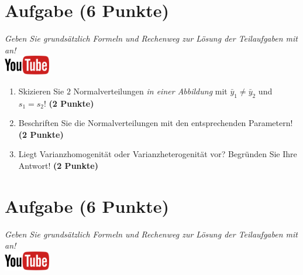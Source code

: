 \documentclass[a4paper, 10pt]{scrartcl}\usepackage[]{graphicx}\usepackage[]{xcolor}
\begin{document}
 
\clearpage

\section{Aufgabe \hfill (6 Punkte)}

\textit{Geben Sie grunds{\"a}tzlich Formeln und Rechenweg zur L{\"o}sung der
  Teilaufgaben mit an!} \\[1Ex]

\hfill\href{https://youtu.be/ZrJhn2wPbq4}{\includegraphics[width =
  2cm]{img/youtube}}\\[1Ex]



\begin{enumerate}
\item Skizieren Sie $2$ Normalverteilungen \textit{in einer
    Abbildung} mit $\bar{y}_1 \neq \bar{y}_2$ und $s_1 = s_2$! \textbf{(2 Punkte)}
\item Beschriften Sie die Normalverteilungen mit den entsprechenden
  Parametern! \textbf{(2 Punkte)}
\item Liegt Varianzhomogenit{\"a}t oder Varianzheterogenit{\"a}t vor? Begr{\"u}nden Sie
  Ihre Antwort! \textbf{(2 Punkte)}
\end{enumerate}

 
\clearpage

\section{Aufgabe \hfill (6 Punkte)}

\textit{Geben Sie grunds{\"a}tzlich Formeln und Rechenweg zur L{\"o}sung der
  Teilaufgaben mit an!} \\[1Ex]

\hfill\href{https://youtu.be/aXvxGC4YLqk}{\includegraphics[width =
  2cm]{img/youtube}}\\[1Ex]
\end{document}
